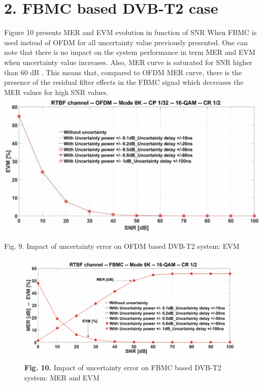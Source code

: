 \documentclass[10pt]{article}
\begin{document}
\section*{2. FBMC based DVB-T2 case}
Figure 10 presents MER and EVM evolution in function of SNR When FBMC is used instead of OFDM for all uncertainty value previously presented. One can note that there is no impact on the system performance in term MER and EVM when uncertainty value increases. Also, MER curve is saturated for SNR higher than 60 dB . This means that, compared to OFDM MER curve, there is the presence of the residual filter effects in the FBMC signal which decreases the MER values for high SNR values.\\
\includegraphics[max width=\textwidth, center]{2024_11_15_3776bfa3c020725d7730g-4(1)}

Fig. 9. Impact of uncertainty error on OFDM based DVB-T2 system: EVM

\setcounter{page}{199}

\begin{figure}[h]
    \centering
    \includegraphics[width=\textwidth]{images/coicoin.png}
    \caption{\textbf{Fig. 10.} Impact of uncertainty error on FBMC based DVB-T2 system: MER and EVM}
\end{figure}
\end{document}
